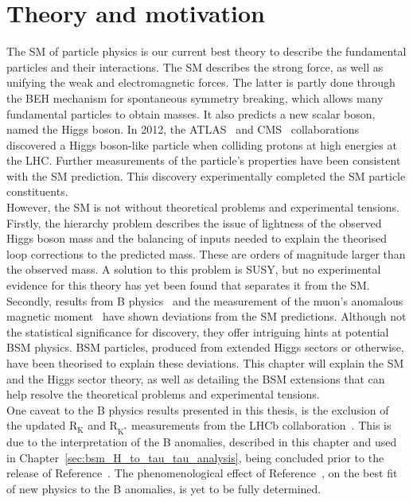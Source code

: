 \chapter{Theory and motivation}
\label{sec:theory}

The \ac{SM} of particle physics is our current best theory to describe the fundamental particles and their interactions.
The \ac{SM} describes the strong force, as well as unifying the weak and electromagnetic forces.
The latter is partly done through the \ac{BEH} mechanism for spontaneous symmetry breaking, which allows many fundamental particles to obtain masses.
It also predicts a new scalar boson, named the Higgs boson.
In 2012, the ATLAS~\cite{ATLAS_Higgs_Discovery} and CMS~\cite{CMS_Higgs_Discovery} collaborations discovered a Higgs boson-like particle when colliding protons at high energies at the \ac{LHC}. 
Further measurements of the particle's properties have been consistent with the \ac{SM} prediction.
This discovery experimentally completed the \ac{SM} particle constituents. \\

However, the \ac{SM} is not without theoretical problems and experimental tensions.
Firstly, the hierarchy problem describes the issue of lightness of the observed Higgs boson mass and the  balancing of inputs needed to explain the theorised loop corrections to the predicted mass. 
These are orders of magnitude larger than the observed mass.
A solution to this problem is \ac{SUSY}, but no experimental evidence for this theory has yet been found that separates it from the \ac{SM}. 
Secondly, results from B physics~\cite{LHCb:2021trn,Kowalewski:2013mna,BaBar:2013mob,Belle:2015qfa,LHCb:2015gmp,Belle:2016dyj,LHCb:2017rln,LHCb:2017smo} and the measurement of the muon's anomalous magnetic moment~\cite{Muong-2:2006rrc,Muong-2:2021ojo} have shown deviations from the \ac{SM} predictions.
Although not the statistical significance for discovery, they offer intriguing hints at potential \ac{BSM} physics.
\ac{BSM} particles, produced from extended Higgs sectors or otherwise, have been theorised to explain these deviations.
This chapter will explain the \ac{SM} and the Higgs sector theory, as well as detailing the \ac{BSM} extensions that can help resolve the theoretical problems and experimental tensions. \\

One caveat to the B physics results presented in this thesis, is the exclusion of the updated $\text{R}_{\text{K}}$ and $\text{R}_{\text{K}^{*}}$ measurements from the LHCb collaboration~\cite{LHCb:2022zom}.
This is due to the interpretation of the B anomalies, described in this chapter and used in Chapter~\ref{sec:bsm_H_to_tau_tau_analysis}, being concluded prior to the release of Reference~\cite{LHCb:2022zom}.
The phenomenological effect of Reference~\cite{LHCb:2022zom}, on the best fit of new physics to the B anomalies, is yet to be fully determined.

